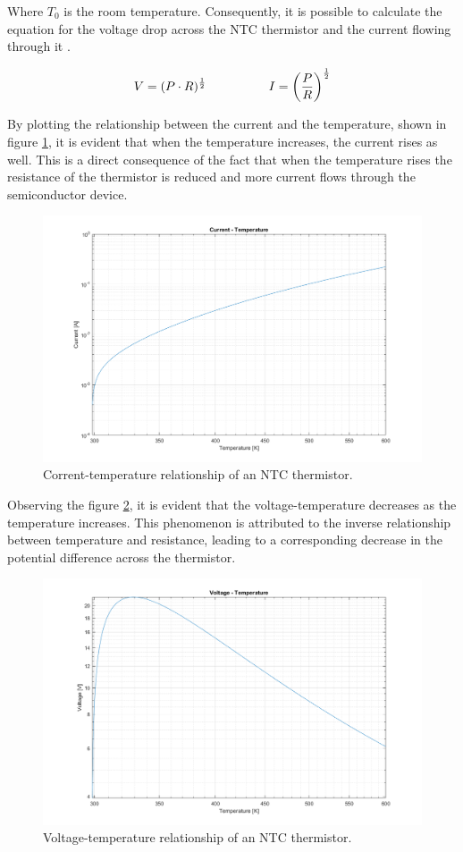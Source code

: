 \noindent Where $T_0$ is the room temperature. Consequently, it is possible to calculate the equation for the voltage drop across the NTC thermistor and the current flowing through it \cite{Keskin2005244}.

\begin{equation*}
    V = (P\cdot R)^{\frac{1}{2}} \hspace{50px} I = \left(\frac{P}{R}\right)^{\frac{1}{2}}
\end{equation*}

\noindent By plotting the relationship between the current and the temperature, shown in figure \ref{fig:NTC_curr-temp}, it is evident that when the temperature increases, the current rises as well. This is a direct consequence of the fact that when the temperature rises the resistance of the thermistor is reduced and more current flows through the semiconductor device.

\begin{figure}[h]
    \centering
    \includegraphics[width = .75\textwidth]{../res/plots/NTC_curr-temp.png}
    \caption{Corrent-temperature relationship of an NTC thermistor.}
    \label{fig:NTC_curr-temp}
\end{figure}

\FloatBarrier\noindent Observing the figure \ref{fig:NTC_volt-temp}, it is evident that the voltage-temperature decreases as the temperature increases. This phenomenon is attributed to the inverse relationship between temperature and resistance, leading to a corresponding decrease in the potential difference across the thermistor.

\begin{figure}[h]
    \centering
    \includegraphics[width = .75\textwidth]{../res/plots/NTC_volt-temp.png}
    \caption{Voltage-temperature relationship of an NTC thermistor.}
    \label{fig:NTC_volt-temp}
\end{figure}


